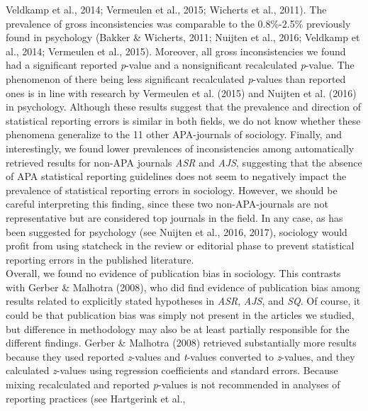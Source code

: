 \documentclass[
  12pt,
]{article}
\begin{document}
Veldkamp et al., 2014; Vermeulen et al., 2015; Wicherts et al., 2011).
The prevalence of gross inconsistencies was comparable to the
0.8\%-2.5\% previously found in psychology (Bakker \& Wicherts, 2011;
Nuijten et al., 2016; Veldkamp et al., 2014; Vermeulen et al., 2015).
Moreover, all gross inconsistencies we found had a significant reported
\emph{p}-value and a nonsignificant recalculated \emph{p}-value. The
phenomenon of there being less significant recalculated \emph{p}-values
than reported ones is in line with research by Vermeulen et al. (2015)
and Nuijten et al. (2016) in psychology. Although these results suggest
that the prevalence and direction of statistical reporting errors is
similar in both fields, we do not know whether these phenomena
generalize to the 11 other APA-journals of sociology. Finally, and
interestingly, we found lower prevalences of inconsistencies among
automatically retrieved results for non-APA journals \emph{ASR} and
\emph{AJS}, suggesting that the absence of APA statistical reporting
guidelines does not seem to negatively impact the prevalence of
statistical reporting errors in sociology. However, we should be careful
interpreting this finding, since these two non-APA-journals are not
representative but are considered top journals in the field. In any
case, as has been suggested for psychology (see Nuijten et al., 2016,
2017), sociology would profit from using statcheck in the review or
editorial phase to prevent statistical reporting errors in the published
literature. ~\\
\hspace*{0.333em}\hspace*{0.333em}\hspace*{0.333em}\hspace*{0.333em}Overall,
we found no evidence of publication bias in sociology. This contrasts
with Gerber \& Malhotra (2008), who did find evidence of publication
bias among results related to explicitly stated hypotheses in
\emph{ASR}, \emph{AJS}, and \emph{SQ}. Of course, it could be that
publication bias was simply not present in the articles we studied, but
difference in methodology may also be at least partially responsible for
the different findings. Gerber \& Malhotra (2008) retrieved
substantially more results because they used reported \emph{z}-values
and \emph{t}-values converted to \emph{z}-values, and they calculated
\emph{z}-values using regression coefficients and standard errors.
Because mixing recalculated and reported \emph{p}-values is not
recommended in analyses of reporting practices (see Hartgerink et al.,
\end{document}
